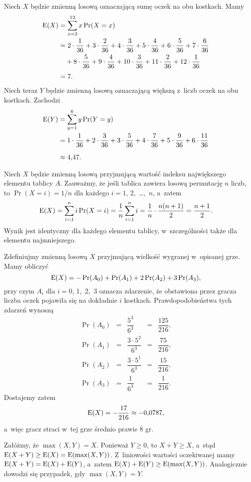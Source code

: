 \exercise{} %
Niech $X$ będzie zmienną losową oznaczającą sumę oczek na obu kostkach. Mamy
\begin{align*}
	\operatorname{E}(X) &= \sum_{x=2}^{12}x\Pr(X=x) \\
	&= 2\cdot\frac{1}{36}+3\cdot\frac{2}{36}+4\cdot\frac{3}{36}+5\cdot\frac{4}{36}+6\cdot\frac{5}{36}+7\cdot\frac{6}{36} \\
	&\quad +8\cdot\frac{5}{36}+9\cdot\frac{4}{36}+10\cdot\frac{3}{36}+11\cdot\frac{2}{36}+12\cdot\frac{1}{36} \\[1mm]
	&= 7.
\end{align*}
Niech teraz $Y$ będzie zmienną losową oznaczającą większą z~liczb oczek na obu kostkach. Zachodzi
\begin{align*}
	\operatorname{E}(Y) &= \sum_{y=1}^{6}y\Pr(Y=y) \\
	&= 1\cdot\frac{1}{36}+2\cdot\frac{3}{36}+3\cdot\frac{5}{36}+4\cdot\frac{7}{36}+5\cdot\frac{9}{36}+6\cdot\frac{11}{36} \\[2mm]
	&\approx 4{,}47.
\end{align*}

\exercise{} %
Niech $X$ będzie zmienną losową przyjmującą wartość indeksu największego elementu tablicy $A$. Zauważmy, że jeśli tablica zawiera losową permutację $n$ liczb, to $\Pr(X=i)=1/n$ dla każdego $i=1$, 2,~\dots,~$n$, a~zatem
\[
	\operatorname{E}(X) = \sum_{i=1}^ni\Pr(X=i) = \frac{1}{n}\sum_{i=1}^ni = \frac{1}{n}\cdot\frac{n(n+1)}{2} = \frac{n+1}{2}.
\]
Wynik jest identyczny dla każdego elementu tablicy, w~szczególności także dla elementu najmniejszego.

\exercise{} %
Zdefiniujmy zmienną losową $X$ przyjmującą wielkość wygranej w~opisanej grze. Mamy obliczyć
\[
	\operatorname{E}(X) = -\Pr(A_0)+\Pr(A_1)+2\Pr(A_2)+3\Pr(A_3),
\]
przy czym $A_i$ dla $i=0$, 1,~2,~3 oznacza zdarzenie, że obstawiona przez gracza liczba oczek pojawiła się na dokładnie $i$ kostkach. Prawdopodobieństwa tych zdarzeń wynoszą
\[
	\begin{matrix}
	\Pr(A_0) &=& \dfrac{5^3}{6^3} &=& \dfrac{125}{216}, \\[3mm]
	\Pr(A_1) &=& \dfrac{3\cdot 5^2}{6^3} &=& \dfrac{75}{216}, \\[3mm]
	\Pr(A_2) &=& \dfrac{3\cdot 5^1}{6^3} &=& \dfrac{15}{216}, \\[3mm]
	\Pr(A_3) &=& \dfrac{1}{6^3} &=& \dfrac{1}{216}.
	\end{matrix}
\]
Dostajemy zatem
\[
	\operatorname{E}(X) = -\dfrac{17}{216} \approx -0{,}0787,
\]
a~więc gracz straci w~tej grze średnio prawie 8 gr.

\exercise{} %
Załóżmy, że $\max(X,Y)=X$. Ponieważ $Y\ge0$, to $X+Y\ge X$, a~stąd $\operatorname{E}(X+Y)\ge\operatorname{E}(X)=\operatorname{E}(\max(X,Y))$. Z~liniowości wartości oczekiwanej mamy $\operatorname{E}(X+Y)=\operatorname{E}(X)+\operatorname{E}(Y)$, a~zatem $\operatorname{E}(X)+\operatorname{E}(Y)\ge\operatorname{E}(\max(X,Y))$. Analogicznie dowodzi się przypadek, gdy $\max(X,Y)=Y$.

